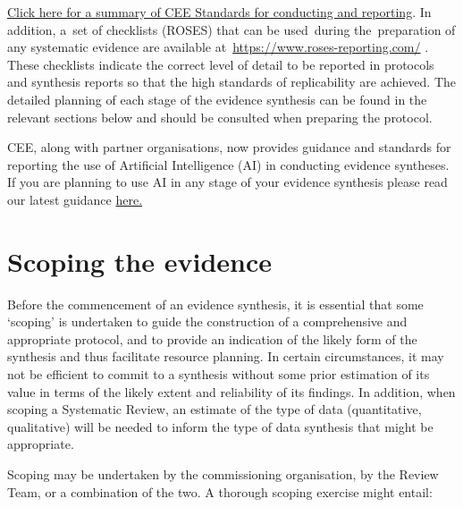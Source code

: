 \documentclass[
  letterpaper,
  DIV=11,
  numbers=noendperiod]{scrreprt}
\begin{document}
\href{https://environmentalevidence.org/standards-table/}{Click here for
a summary of CEE Standards for conducting and reporting}. In addition,
a~set of checklists (ROSES) that can be used~during the~preparation of
any systematic evidence are available
at~\href{https://eur01.safelinks.protection.outlook.com/?url=https\%3A\%2F\%2Fwww.roses-reporting.com\%2F&data=02\%7C01\%7Ca.s.pullin\%40bangor.ac.uk\%7C4395523ed6634e974ef608d83b673f44\%7Cc6474c55a9234d2a9bd4ece37148dbb2\%7C0\%7C0\%7C637324661917117452&sdata=1EaWxTy7ePTawTmTaW19D8gdZD6zvfldlp4rIZcOLy8\%3D&reserved=0}{https://www.roses-reporting.com/}
.~ These checklists indicate the correct level of detail to be reported
in protocols and synthesis reports so that the high standards of
replicability are achieved. The detailed planning of each stage of the
evidence synthesis can be found in the relevant sections below and
should be consulted when preparing the protocol.

CEE, along with partner organisations, now provides guidance and
standards for reporting the use of Artificial Intelligence (AI) in
conducting evidence syntheses. If you are planning to use AI in any
stage of your evidence synthesis please read our latest guidance
\href{https://environmentalevidence.org/artificial-intelligence-reporting-guidance/}{here.}

\section{\texorpdfstring{\textbf{Scoping the
evidence}}{Scoping the evidence}}\label{scoping-the-evidence}

Before the commencement of an evidence synthesis, it is essential that
some `scoping' is undertaken to guide the construction of a
comprehensive and appropriate protocol, and to provide an indication of
the likely form of the synthesis and thus facilitate resource planning.
In certain circumstances, it may not be efficient to commit to a
synthesis without some prior estimation of its value in terms of the
likely extent and reliability of its findings. In addition, when scoping
a Systematic Review, an estimate of the type of data (quantitative,
qualitative) will be needed to inform the type of data synthesis that
might be appropriate.

Scoping may be undertaken by the commissioning organisation, by the
Review Team, or a combination of the two. A thorough scoping exercise
might entail:
\end{document}
